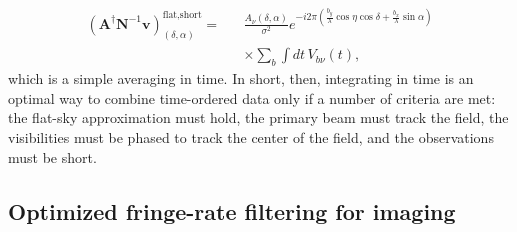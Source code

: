 \documentclass[twocolumn,apj,numberedappendix]{emulateapj}
\newcommand{\vis}{\mathbf{v}}
\newcommand{\A}{\mathbf{A}}
\newcommand{\N}{\mathbf{N}}
\begin{document}
\begin{eqnarray}
\left( \A^\dagger \N^{-1} \vis \right)_{(\delta,\alpha)}^\textrm{flat,short} =  &&\frac{A_\nu(\delta,\alpha)}{\sigma^2} e^{-i 2 \pi \left( \frac{b_y}{\lambda} \cos \eta \cos \delta + \frac{b_x}{\lambda} \sin\alpha \right)} \nonumber \\
&& \times \sum_b   \int  dt \, V_{b\nu}(t),
\end{eqnarray}
which is a simple averaging in time.  In short, then, integrating in time is an
optimal way to combine time-ordered data only if a number of criteria are met:
the flat-sky approximation must hold, the primary beam must track the field,
the visibilities must be phased to track the center of the field, and the
observations must be short.

\subsection{Optimized fringe-rate filtering for imaging}
\label{fringeRateIntro}
\end{document}
